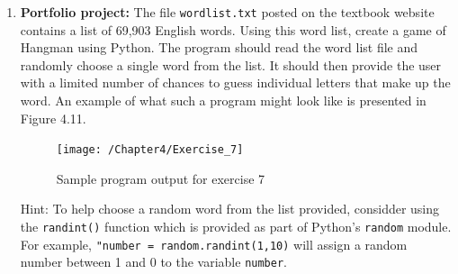 \documentclass{book}
\begin{document}
\begin{enumerate}
	\item \textbf{Portfolio project:} The file \texttt{wordlist.txt} posted on the textbook website contains a list of 69,903 English words. Using this word list, create a game of Hangman using Python. The program should read the word list file and randomly choose a single word from the list. It should then provide the user with a limited number of chances to guess individual letters that make up the word. An example of what such a program might look like is presented in Figure 4.11.
	
	\begin{figure}[h]
		\caption{Sample program output for exercise 7}
		\centering\texttt{[image: /Chapter4/Exercise\_7]}
	\end{figure}

	Hint: To help choose a random word from the list provided, considder using the \texttt{randint()} function which is provided as part of Python's \texttt{random} module. For example, \texttt{"number = random.randint(1,10)} will assign a random number between 1 and 0 to the variable \texttt{number}.
\end{enumerate}
\end{document}
